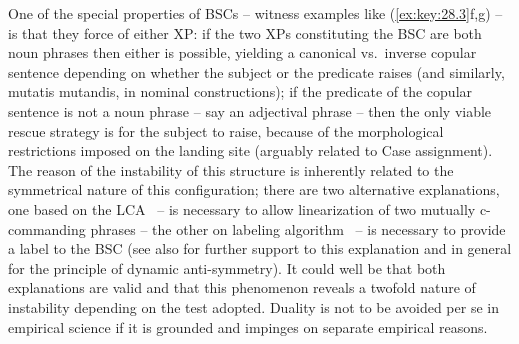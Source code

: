 \documentclass[output=paper]{langsci/langscibook}
\begin{document}
One of the special properties of \glspl{BSC} – witness
examples like (\ref{ex:key:28.3}f,g) -- is that they force  of either XP: if the two XPs constituting the \gls{BSC}
are both noun phrases then either  is possible, yielding a canonical
vs.\ inverse copular sentence depending on whether the subject or the predicate
raises (and similarly, mutatis mutandis, in nominal constructions); if
the predicate of the copular sentence is not a noun phrase -- say an adjectival
phrase -- then the only viable rescue strategy is for the subject to raise,
because of the morphological restrictions imposed on the landing site (arguably
related to Case assignment). The reason of the instability of this structure is
inherently related to the symmetrical nature of this configuration; there are
two alternative explanations, one based on the \gls{LCA} \citep{Moro2000}~– 
is necessary to allow linearization of two mutually c-commanding phrases -- the
other on labeling algorithm \citep{Moro2009}~–  is necessary to provide
a label to the \gls{BSC} (see also
\citealt{Moro2000,Moro2009,Chomsky2013,Chomsky2017,ChoGalOtt2019,Rizzi2015,Rizzi2016}
for further support to this explanation and in general for the principle of
dynamic anti-symmetry). It could well be that both explanations are valid and
that this phenomenon reveals a twofold nature of instability depending on the
test adopted. Duality is not to be avoided per se in empirical science
if it is grounded and impinges on separate empirical reasons.\largerpage[-1]
\end{document}
